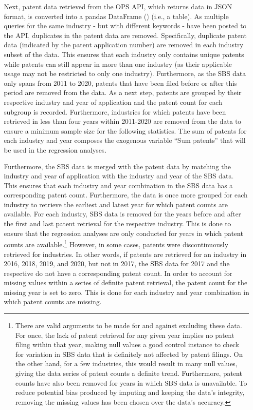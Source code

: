 \documentclass[
  11,
  a4paperpaper,
]{article}
\begin{document}
Next, patent data retrieved from the OPS API, which returns data in JSON
format, is converted into a pandas DataFrame
() (i.e., a table). As multiple queries for
the same industry - but with different keywords - have been posted to
the API, duplicates in the patent data are removed. Specifically,
duplicate patent data (indicated by the patent application number) are
removed in each industry subset of the data. This ensures that each
industry only contains unique patents while patents can still appear in
more than one industry (as their applicable usage may not be restricted
to only one industry). Furthermore, as the SBS data only spans from 2011
to 2020, patents that have been filed before or after this period are
removed from the data. As a next step, patents are grouped by their
respective industry and year of application and the patent count for
each subgroup is recorded. Furthermore, industries for which patents
have been retrieved in less than four years within 2011-2020 are removed
from the data to ensure a minimum sample size for the following
statistics. The sum of patents for each industry and year composes the
exogenous variable ``Sum patents'' that will be used in the regression
analyses.

Furthermore, the SBS data is merged with the patent data by matching the
industry and year of application with the industry and year of the SBS
data. This ensures that each industry and year combination in the SBS
data has a corresponding patent count. Furthermore, the data is once
more grouped for each industry to retrieve the earliest and latest year
for which patent counts are available. For each industry, SBS data is
removed for the years before and after the first and last patent
retrieval for the respective industry. This is done to ensure that the
regression analyses are only conducted for years in which patent counts
are available.\footnote{There are valid arguments to be made for and
  against excluding these data. For once, the lack of patent retrieval
  for any given year implies no patent filing within that year, making
  null values a good control instance to check for variation in SBS data
  that is definitely not affected by patent filings. On the other hand,
  for a few industries, this would result in many null values, giving
  the data series of patent counts a definite trend. Furthermore, patent
  counts have also been removed for years in which SBS data is
  unavailable. To reduce potential bias produced by imputing and keeping
  the data's integrity, removing the missing values has been chosen over
  the data's accuracy.} However, in some cases, patents were
discontinuously retrieved for industries. In other words, if patents are
retrieved for an industry in 2016, 2018, 2019, and 2020, but not in
2017, the SBS data for 2017 and the respective do not have a
corresponding patent count. In order to account for missing values
within a series of definite patent retrieval, the patent count for the
missing year is set to zero. This is done for each industry and year
combination in which patent counts are
missing.\label{cleaning-missing-values}
\end{document}
